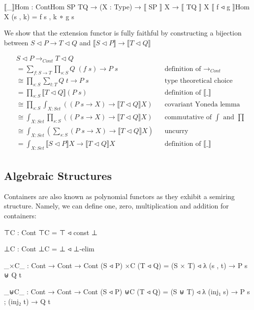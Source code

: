 \begin{code}
⟦_⟧Hom : ContHom SP TQ → (X : Type) → ⟦ SP ⟧ X → ⟦ TQ ⟧ X
⟦ f ◃ g ⟧Hom X (s , k) = f s , k ∘ g s
\end{code}

We show that the extension functor is fully faithful by constructing a bijection between $S \triangleleft P \to T \triangleleft Q$ and $\llbracket S \triangleleft P \rrbracket \to \llbracket T \triangleleft Q \rrbracket$

\begin{align*}
& S \triangleleft P \rightarrow_{Cont} T \triangleleft Q \\
&= \sum_{f : S \to T} \prod_{s : S} Q \; (f \; s) \to P \; s && \text{definition of $\rightarrow_{Cont}$} \\
&\cong \prod_{s : S} \sum_{t : T} Q \; t \to P \; s && \text{type theoretical choice} \\
&= \prod_{s : S} \llbracket T \triangleleft Q \rrbracket (P \; s) && \text{definition of $\llbracket \_ \rrbracket$} \\
&\cong \prod_{s : S} \int_{X : Set} ((P \; s \to X) \to \llbracket T \triangleleft Q \rrbracket X) && \text{covariant Yoneda lemma} \\
&\cong \int_{X : Set} \prod_{s : S} ((P \; s \to X) \to \llbracket T \triangleleft Q \rrbracket X) && \text{commutative of $\int$ and $\prod$} \\
&\cong \int_{X : Set} (\sum_{s : S} (P \; s \to X) \to \llbracket T \triangleleft Q \rrbracket X) && \text{uncurry} \\
&= \int_{X : Set} \llbracket S \triangleleft P \rrbracket X \to \llbracket T \triangleleft Q \rrbracket X && \text{definition of $\llbracket \_ \rrbracket$} \\
\end{align*}

\subsection{Algebraic Structures}

Containers are also known as polynomial functors as they exhibit a semiring structure. Namely, we can define one, zero, multiplication and addition for containers:

\begin{code}
⊤C : Cont
⊤C = ⊤ ◃ const ⊥

⊥C : Cont
⊥C = ⊥ ◃ ⊥-elim

_×C_ : Cont → Cont → Cont
(S ◃ P) ×C (T ◃ Q) = (S × T) ◃ λ (s , t) → P s ⊎ Q t

_⊎C_ : Cont → Cont → Cont
(S ◃ P) ⊎C (T ◃ Q) = (S ⊎ T) ◃ λ{ (inj₁ s) → P s ; (inj₂ t) → Q t }
\end{code}

